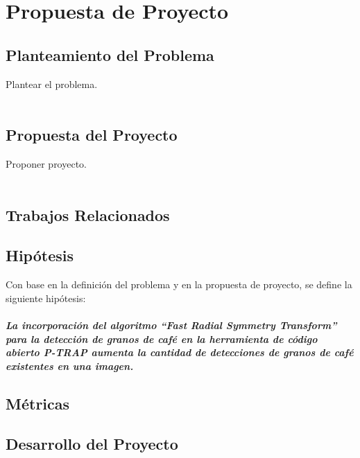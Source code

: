 \section{\textbf{Propuesta de Proyecto}}
\subsection{Planteamiento del Problema}
Plantear el problema.\\\\
\subsection{Propuesta del Proyecto}
Proponer proyecto.\\\\
\subsection{Trabajos Relacionados}
\subsection{Hip\'otesis}
Con base en la definici\'on del problema y en la propuesta de proyecto, se define la siguiente hip\'otesis:\\\\
\textbf{\textit{La incorporaci\'on del algoritmo “Fast Radial Symmetry Transform” para la detecci\'on de granos de caf\'e en la herramienta de c\'odigo abierto P-TRAP aumenta la cantidad de detecciones de granos de caf\'e existentes en una imagen.}} 
\subsection{M\'etricas}
\subsection{Desarrollo del Proyecto}
